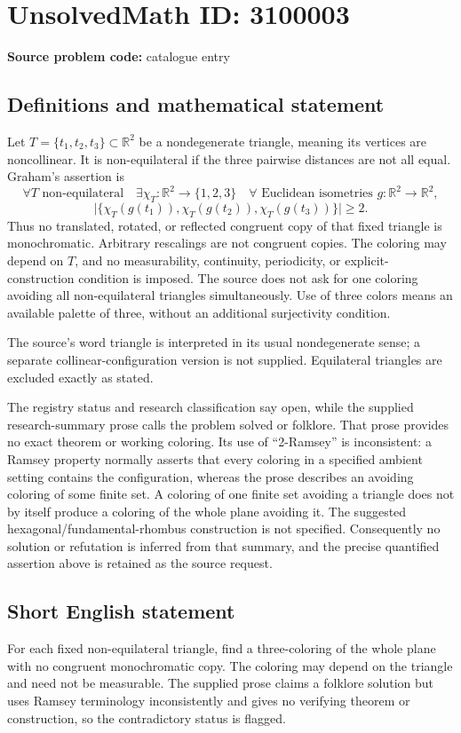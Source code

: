 \documentclass[11pt]{article}
\newcommand{\R}{\mathbb{R}}
\begin{document}
\section*{UnsolvedMath ID: 3100003}
\textbf{Source problem code:} catalogue entry
\subsection{Definitions and mathematical statement}
Let $T=\{t_1,t_2,t_3\}\subset\R^2$ be a nondegenerate triangle, meaning its vertices are noncollinear. It is non-equilateral if the three pairwise distances are not all equal. Graham's assertion is
\[
\forall T\text{ non-equilateral}\quad
\exists\chi_T:\R^2\to\{1,2,3\}\quad
\forall\text{ Euclidean isometries }g:\R^2\to\R^2,
\]
\[
\bigl|\{\chi_T(g(t_1)),\chi_T(g(t_2)),\chi_T(g(t_3))\}\bigr|\ge2.
\]
Thus no translated, rotated, or reflected congruent copy of that fixed triangle is monochromatic. Arbitrary rescalings are not congruent copies. The coloring may depend on $T$, and no measurability, continuity, periodicity, or explicit-construction condition is imposed. The source does not ask for one coloring avoiding all non-equilateral triangles simultaneously. Use of three colors means an available palette of three, without an additional surjectivity condition.

The source's word triangle is interpreted in its usual nondegenerate sense; a separate collinear-configuration version is not supplied. Equilateral triangles are excluded exactly as stated.

The registry status and research classification say open, while the supplied research-summary prose calls the problem solved or folklore. That prose provides no exact theorem or working coloring. Its use of ``2-Ramsey'' is inconsistent: a Ramsey property normally asserts that every coloring in a specified ambient setting contains the configuration, whereas the prose describes an avoiding coloring of some finite set. A coloring of one finite set avoiding a triangle does not by itself produce a coloring of the whole plane avoiding it. The suggested hexagonal/fundamental-rhombus construction is not specified. Consequently no solution or refutation is inferred from that summary, and the precise quantified assertion above is retained as the source request.
\subsection{Short English statement}
For each fixed non-equilateral triangle, find a three-coloring of the whole plane with no congruent monochromatic copy. The coloring may depend on the triangle and need not be measurable. The supplied prose claims a folklore solution but uses Ramsey terminology inconsistently and gives no verifying theorem or construction, so the contradictory status is flagged.
\end{document}
